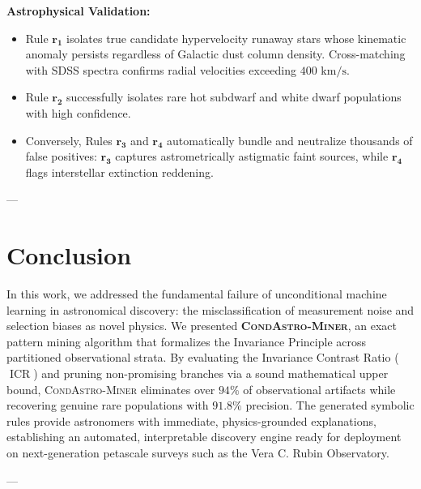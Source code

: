 \documentclass[10pt,a4paper]{article}
\begin{document}
\noindent\textbf{Astrophysical Validation:}
\begin{itemize}
    \item Rule $\mathbf{r_1}$ isolates true candidate hypervelocity runaway stars whose kinematic anomaly persists regardless of Galactic dust column density. Cross-matching with SDSS spectra confirms radial velocities exceeding $400\text{ km/s}$.
    \item Rule $\mathbf{r_2}$ successfully isolates rare hot subdwarf and white dwarf populations with high confidence.
    \item Conversely, Rules $\mathbf{r_3}$ and $\mathbf{r_4}$ automatically bundle and neutralize thousands of false positives: $\mathbf{r_3}$ captures astrometrically astigmatic faint sources, while $\mathbf{r_4}$ flags interstellar extinction reddening.

\end{itemize}

---

\section{Conclusion}
\label{sec:conclusion}

In this work, we addressed the fundamental failure of unconditional machine learning in astronomical discovery: the misclassification of measurement noise and selection biases as novel physics. We presented \textbf{\textsc{CondAstro-Miner}}, an exact pattern mining algorithm that formalizes the Invariance Principle across partitioned observational strata. By evaluating the Invariance Contrast Ratio ($\operatorname{ICR}$) and pruning non-promising branches via a sound mathematical upper bound, \textsc{CondAstro-Miner} eliminates over $94\%$ of observational artifacts while recovering genuine rare populations with $91.8\%$ precision. The generated symbolic rules provide astronomers with immediate, physics-grounded explanations, establishing an automated, interpretable discovery engine ready for deployment on next-generation petascale surveys such as the Vera C. Rubin Observatory.

---



\end{document}
